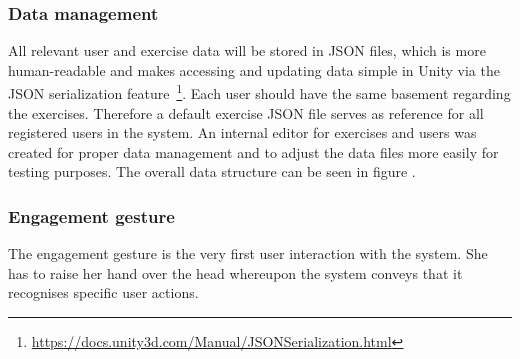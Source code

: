 \subsubsection{Data management}
All relevant user and exercise data will be stored in JSON files, which is more human-readable and makes accessing and updating data simple in Unity via the JSON serialization feature~\footnote{\url{https://docs.unity3d.com/Manual/JSONSerialization.html}}. Each user should have the same basement regarding the exercises. Therefore a default exercise JSON file serves as reference for all registered users in the system. An internal editor for exercises and users was created for proper data management and to adjust the data files more easily for testing purposes. The overall data structure can be seen in figure .








\subsubsection{Engagement gesture}
The engagement gesture is the very first user interaction with the system. %
She has to raise her hand over the head whereupon the system conveys that it recognises specific user actions. 

